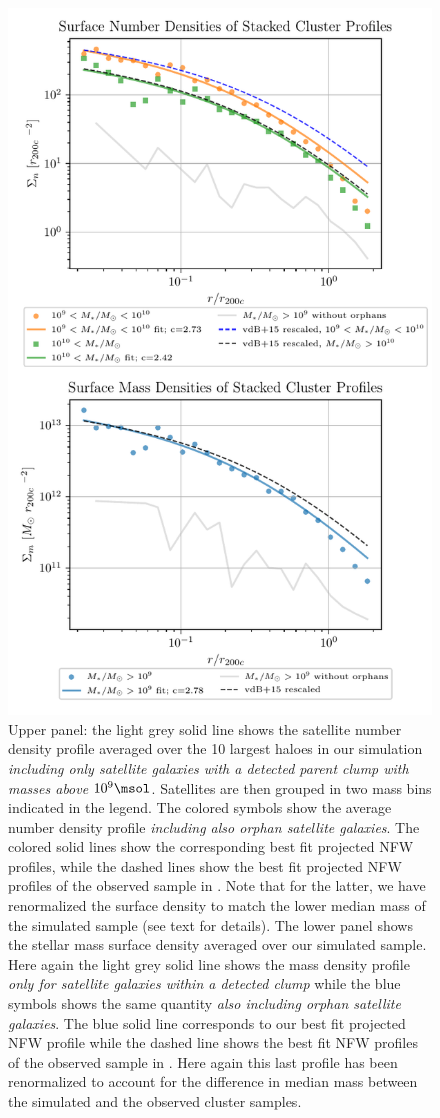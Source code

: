 \begin{figure}
  \centering
  \includegraphics[width=.7\linewidth, keepaspectratio]
	{figures/ACACIA/radial-profiles.pdf}%
  \caption{Upper panel: the light grey  solid line shows the satellite
    number density profile averaged over  the 10 largest haloes in our
    simulation \emph{including only  satellite galaxies with a detected
    parent clump with masses above $10^9 \msol$}.   Satellites are
    then grouped  in two  mass bins
    indicated in  the legend. The colored  symbols show  the average
    number  density  profile  \emph{including  also  orphan  satellite
      galaxies}.  The colored solid  lines show the corresponding best
    fit projected NFW  profiles, while the  dashed lines  show the best
    fit projected NFW profiles of the observed sample in
    \citet{vanderburgEvidenceInsideoutGrowth2015}.  Note  that for the
    latter,  we have  renormalized the  surface density  to match  the
    lower median mass of the  simulated sample (see text for details).
    The lower  panel shows the  stellar mass surface  density averaged
    over our  simulated sample. Here  again the light grey  solid line
    shows the  mass density profile \emph{only for  satellite galaxies
      within a detected  clump} while the blue symbols  shows the same
    quantity \emph{also including  orphan satellite galaxies}. The blue
    solid  line corresponds  to our  best  fit projected NFW  profile while  the
    dashed line shows the best fit NFW profiles of the observed sample
    in \citet{vanderburgEvidenceInsideoutGrowth2015}.  Here again this
    last profile has  been renormalized to account  for the difference
    in  median mass  between the  simulated and  the observed  cluster
    samples.}
%
  \label{fig:radial-profiles}
\end{figure}

